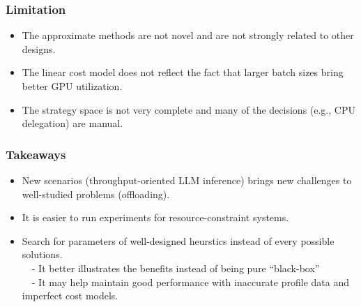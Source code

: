 \documentclass[12pt,aspectratio=169]{beamer}
\begin{document}
    \begin{frame}
        \frametitle{Limitation}

        \begin{itemize}
            \setlength{\itemsep}{.8em}
            \item The approximate methods are not novel and are not strongly related to other designs.
            \item The linear cost model does not reflect the fact that larger batch sizes bring better GPU utilization.
            \item The strategy space is not very complete and many of the decisions (e.g., CPU delegation) are manual.
        \end{itemize}
    \end{frame}

    \begin{frame}
        \frametitle{Takeaways}

        \begin{itemize}
            \setlength{\itemsep}{.8em}
            \item New scenarios (throughput-oriented LLM inference) brings new challenges to well-studied problems (offloading).
            \item It is easier to run experiments for resource-constraint systems.
            \item Search for parameters of well-designed heurstics instead of every possible solutions.\\
            ~~- It better illustrates the benefits instead of being pure ``black-box'' \\
            ~~- It may help maintain good performance with inaccurate profile data and imperfect cost models.
        \end{itemize}
    \end{frame}

    \appendix

\end{document}
